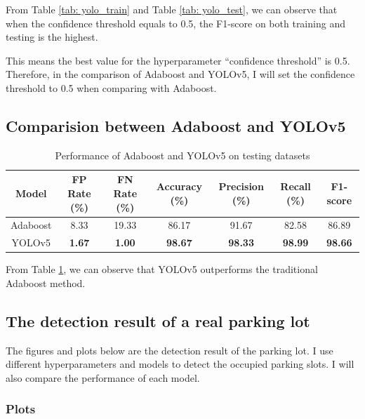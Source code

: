 \documentclass{article}[12pt]
\begin{document}
From Table \ref{tab: yolo_train} and Table \ref{tab: yolo_test}, 
we can observe that when the confidence threshold equals to 0.5, the F1-score on both
training and testing is the highest.

This means the best value for the hyperparameter ``confidence threshold'' is 0.5.
Therefore, in the comparison of Adaboost and YOLOv5, I will set the confidence threshold to 0.5
when comparing with Adaboost.

\subsection{Comparision between Adaboost and YOLOv5}

\begin{table}[H]
    \centering
    \caption{Performance of Adaboost and YOLOv5 on testing datasets}
    \begin{tabular}{@{}ccccccc@{}}
    \toprule
    Model    & FP Rate (\%)  & FN Rate (\%)  & Accuracy (\%)  & Precision (\%) & Recall (\%)    & F1-score       \\ \midrule
    Adaboost & 8.33          & 19.33         & 86.17          & 91.67          & 82.58          & 86.89          \\
    YOLOv5   & \textbf{1.67} & \textbf{1.00} & \textbf{98.67} & \textbf{98.33} & \textbf{98.99} & \textbf{98.66} \\ \bottomrule
    \end{tabular}
    \label{tab:com_ada_yolo}
\end{table}

From Table \ref{tab:com_ada_yolo}, we can observe that YOLOv5 outperforms the traditional
Adaboost method.

\subsection{The detection result of a real parking lot}

The figures and plots below are the detection result of the parking lot. I use different
hyperparameters and models to detect the occupied parking slots. I will also compare the 
performance of each model.

\subsubsection{Plots}
\end{document}
